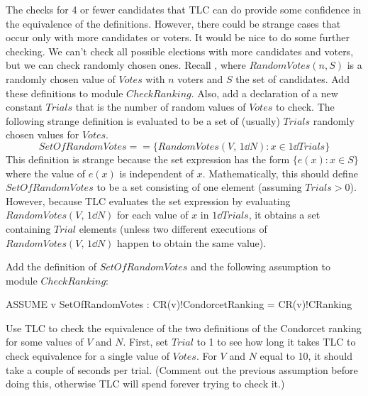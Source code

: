 \documentclass[fleqn,leqno]{article}
\begin{document}
The checks for 4 or fewer candidates that TLC can do provide some
confidence in the equivalence of the definitions.  However, there
could be strange cases that occur only with more candidates or
voters.  It would be nice to do some further checking.  We can't check
all possible elections with more candidates and voters, but we can
check randomly chosen ones.  Recall 
  , 
where $RandomVotes(n, S)$ is a randomly chosen value of $Votes$ with
$n$ voters and $S$ the set of candidates.  Add these definitions to
module $CheckRanking$.  Also, add a declaration of a new constant
$Trials$ that is the number of random values of $Votes$ to check.  The
following strange definition is evaluated to be a set of (usually)
$Trials$ randomly chosen values for $Votes$.%
 \[ SetOfRandomVotes == \{RandomVotes(V, \, 1\dd N) : x \in 1\dd Trials\}
 \]
This definition is strange because the set expression has the form
 $\{e(x) : x \in S\}$
where the value of $e(x)$ is independent of $x$.  Mathematically, this
should define $SetOfRandomVotes$ to be a set consisting of one element
(assuming  $Trials>0$).  However, because TLC evaluates the set expression by
evaluating $RandomVotes(V, \, 1\dd N)$ for each value of $x$ in $1\dd
Trials$, it obtains a set containing $Trial$ elements (unless two
different executions of $RandomVotes(V, \, 1\dd N)$ happen to obtain
the same value).  

Add the definition of $SetOfRandomVotes$ and the following
assumption to module $CheckRanking$:%
\begin{display}
\begin{notla}
ASSUME \A v \in SetOfRandomVotes : CR(v)!CondorcetRanking = CR(v)!CRanking
\end{notla}
\begin{tlatex}
\end{tlatex}
\end{display}
Use TLC to check the equivalence of the two definitions of the
Condorcet ranking for some values of $V$ and $N$.  First, set $Trial$
to 1 to see how long it takes TLC to check equivalence for a single
value of $Votes$.  For $V$ and $N$ equal to 10, it should take a
couple of seconds per trial.  (Comment out the previous assumption
before doing this, otherwise TLC will spend forever trying to check
it.)
\end{document}
